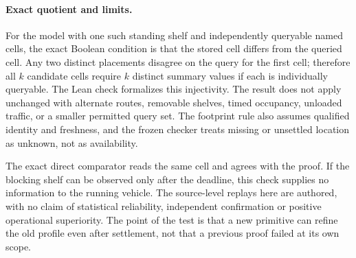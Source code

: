 \documentclass[11pt]{article}
\begin{document}
\paragraph{Exact quotient and limits.}
For the model with one such standing shelf and independently
queryable named cells, the exact Boolean condition is that the
stored cell differs from the queried cell. Any two distinct
placements disagree on the query for the first cell; therefore
all $k$ candidate cells require $k$ distinct summary values if
each is individually queryable. The Lean check formalizes this
injectivity. The result does not apply unchanged with alternate
routes, removable shelves, timed occupancy, unloaded traffic,
or a smaller permitted query set. The footprint rule also assumes
qualified identity and freshness, and the frozen checker treats
missing or unsettled location as unknown, not as availability.

The exact direct comparator reads the same cell and agrees with
the proof. If the blocking shelf can be observed only after the
deadline, this check supplies no information to the running
vehicle. The source-level replays here are authored, with no
claim of statistical reliability, independent confirmation or
positive operational superiority. The point of the test is that a
new primitive can refine the old profile even after settlement,
not that a previous proof failed at its own scope.
\end{document}
